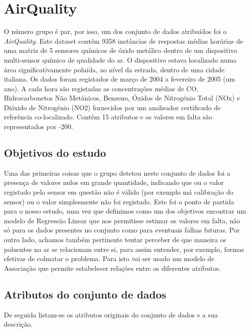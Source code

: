 \section{AirQuality}\label{sec:AirQuality}

O número grupo é par, por isso, um dos conjunto de dados atribuídos foi o \emph{AirQuality}.
Este dataset contém 9358 instâncias de respostas médias horárias de uma matriz de 5 sensores químicos de óxido metálico dentro de um dispositivo multi-sensor químico de qualidade do ar. O dispositivo estava localizado numa área significativamente poluída, ao nível da estrada, dentro de uma cidade italiana. Os dados foram registados de março de 2004 a fevereiro de 2005 (um ano). A cada hora são registadas as concentrações médias de CO, Hidrocarbonetos Não Metánicos, Benzeno, Óxidos de Nitrogénio Total (NOx) e Dióxido de Nitrogénio (NO2) fornecidos por um analisador certificado de referência co-localizado. Contém 15 atributos e os valores em falta são representados por -200.

\subsection{Objetivos do estudo}

Uma das primeiras coisas que o grupo detetou neste conjunto de dados foi a presença de valores nulos em grande quantidade, indicando que ou o valor registado pelo sensor em questão não é válido (por exemplo má calibração do sensor) ou o valor simplesmente não foi registado. Este foi o ponto de partida para o nosso estudo, uma vez que definimos como um dos objetivos encontrar um modelo de Regressão Linear que nos permitisse estimar os valores em falta, não só para os dados presentes no conjunto como para eventuais falhas futuras.
Por outro lado, achamos também pertinente tentar perceber de que maneira os poluentes no ar se relacionam entre si, para assim entender, por exemplo, formas efetivas de colmatar o problema. Para isto vai ser usado um modelo de Associação que permite estabelecer relações entre os diferentes atributos.

\subsection{Atributos do conjunto de dados}

De seguida listam-se os atributos originais do conjunto de dados e a sua descrição.

